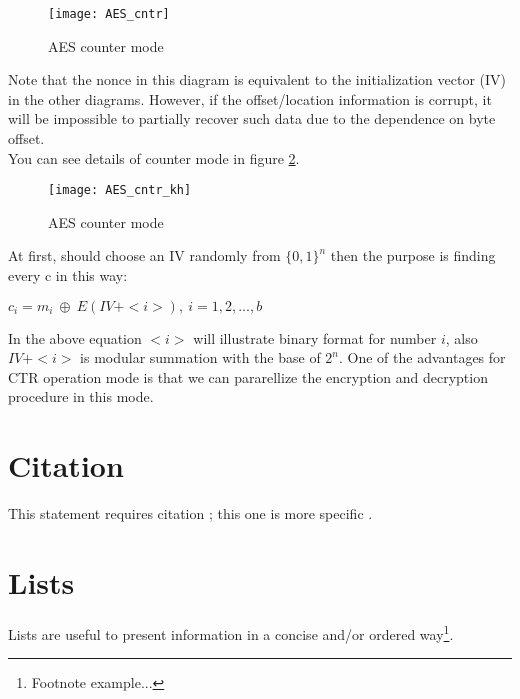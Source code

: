 \begin{figure}[!h]
\centering\texttt{[image: AES\_cntr]}
\caption{AES counter mode}
\label{fig:AES_CTR} %
\end{figure}

Note that the nonce in this diagram is equivalent to the initialization vector (IV) in the other diagrams. However, if the offset/location information is corrupt, it will be impossible to partially recover such data due to the dependence on byte offset.
\\
\linebreak
You can see details of counter mode in figure \ref{fig:AES_cntr_kh}.

\begin{figure}[!h]
\centering\texttt{[image: AES\_cntr\_kh]}
\caption{AES counter mode}
\label{fig:AES_cntr_kh} %
\end{figure}

At first, should choose an IV randomly from $\{0,1\}^n$ then the purpose is finding every c in this way:
\\
\begin{center}
$c_i = m_i\ \oplus\ E(IV + <i>),\ i = 1,2,...,b$	
\end{center}
In the above equation $<i>$ will illustrate binary format for number $i$, also $IV+<i>$ is modular summation with the base of $2^n$.
\linebreak
One of the advantages for CTR operation mode is that we can pararellize the encryption and decryption procedure in this mode.


\section{Citation}

This statement requires citation \cite{article_key}; this one is more specific \cite[162]{book_key}.


\section{Lists}

Lists are useful to present information in a concise and/or ordered way\footnote{Footnote example...}.


